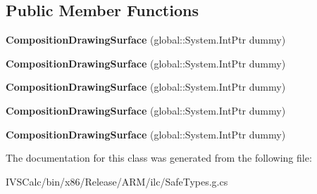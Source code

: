\subsection*{Public Member Functions}
\begin{DoxyCompactItemize}
\item 
\mbox{\label{class_windows_1_1_u_i_1_1_composition_1_1_composition_drawing_surface_a1bafa1a0895354846ad3427e52b0aa43}} 
{\bfseries Composition\+Drawing\+Surface} (global\+::\+System.\+Int\+Ptr dummy)
\item 
\mbox{\label{class_windows_1_1_u_i_1_1_composition_1_1_composition_drawing_surface_a1bafa1a0895354846ad3427e52b0aa43}} 
{\bfseries Composition\+Drawing\+Surface} (global\+::\+System.\+Int\+Ptr dummy)
\item 
\mbox{\label{class_windows_1_1_u_i_1_1_composition_1_1_composition_drawing_surface_a1bafa1a0895354846ad3427e52b0aa43}} 
{\bfseries Composition\+Drawing\+Surface} (global\+::\+System.\+Int\+Ptr dummy)
\item 
\mbox{\label{class_windows_1_1_u_i_1_1_composition_1_1_composition_drawing_surface_a1bafa1a0895354846ad3427e52b0aa43}} 
{\bfseries Composition\+Drawing\+Surface} (global\+::\+System.\+Int\+Ptr dummy)
\item 
\mbox{\label{class_windows_1_1_u_i_1_1_composition_1_1_composition_drawing_surface_a1bafa1a0895354846ad3427e52b0aa43}} 
{\bfseries Composition\+Drawing\+Surface} (global\+::\+System.\+Int\+Ptr dummy)
\end{DoxyCompactItemize}


The documentation for this class was generated from the following file\+:\begin{DoxyCompactItemize}
\item 
I\+V\+S\+Calc/bin/x86/\+Release/\+A\+R\+M/ilc/Safe\+Types.\+g.\+cs\end{DoxyCompactItemize}
